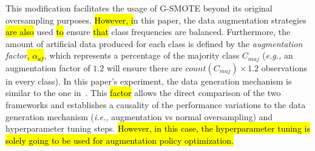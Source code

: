 \documentclass[preprint, 12pt]{elsarticle}
\begin{document}
This modification facilitates the usage of G-SMOTE beyond its original
oversampling purposes. \hl{However, i}n this paper, the data augmentation
strategies \hl{are also }used \hl{to} ensure \hl{that} class frequencies are
balanced. Furthermore, the amount of artificial data produced for each class
is defined by the \textit{augmentation factor}\hl{, $\alpha_{af}$}, which
represents a percentage of the majority class $C_{maj}$ (\textit{e.g.,} an
augmentation factor of $1.2$ will ensure there are $count(C_{maj}) \times 1.2$
observations in every class). In this paper's experiment, the data generation
mechanism is similar to the one in~\cite{Fonseca2021}. This \hl{factor} allows
the direct comparison of the two frameworks and establishes a causality of the
performance variations to the data generation mechanism (\textit{i.e.,}
augmentation vs normal oversampling) and hyperparameter tuning steps.
\hl{However, in this case, the hyperparameter tuning is solely going to
be used for augmentation policy optimization.} 
\end{document}
